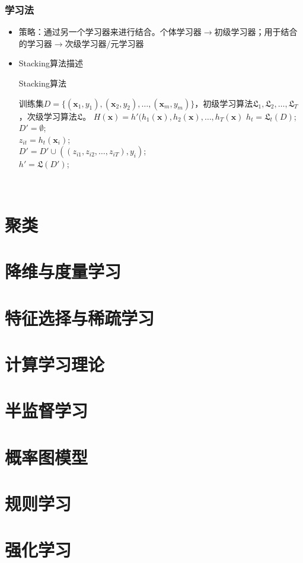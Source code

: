 \documentclass{ctexart}
\begin{document}
 					\subsubsection{学习法}
 						\begin{itemize}
 							\item 策略：通过另一个学习器来进行结合。个体学习器$\rightarrow$初级学习器；用于结合的学习器$\rightarrow$次级学习器/元学习器
 							\item Stacking算法描述\begin{algorithm}
 								\caption{Stacking算法}
 								\begin{algorithmic}[1]
 									\REQUIRE 训练集$D=\{(\bm{x}_1,y_1),(\bm{x}_2,y_2),\dots,(\bm{x}_m,y_m)\}$，初级学习算法$\mathfrak{L}_1,\mathfrak{L}_2,\dots,\mathfrak{L}_T$，次级学习算法$\mathfrak{L}$。
 									\ENSURE $H(\bm{x})=h'(h_1(\bm{x}),h_2(\bm{x}),\dots,h_T(\bm{x})$
 										\STATE $h_t=\mathfrak{L}_t(D)$;\\
 									\ENDFOR
 									\STATE $D'=\emptyset$;\\
 											\STATE $z_{it}=h_t(\bm{x}_i)$;\\
 										\ENDFOR
 										\STATE $D'=D'\cup((z_{i1},z_{i2},\dots,z_{iT}),y_i)$;\\
 									\ENDFOR
 									\STATE $h'=\mathfrak{L}(D')$;
 								\end{algorithmic} 
 							\end{algorithm}
 						\end{itemize}
			\section{聚类}
			\section{降维与度量学习}
			\section{特征选择与稀疏学习}
			\section{计算学习理论}
			\section{半监督学习}
			\section{概率图模型}
			\section{规则学习}
			\section{强化学习}
			
\end{document}

